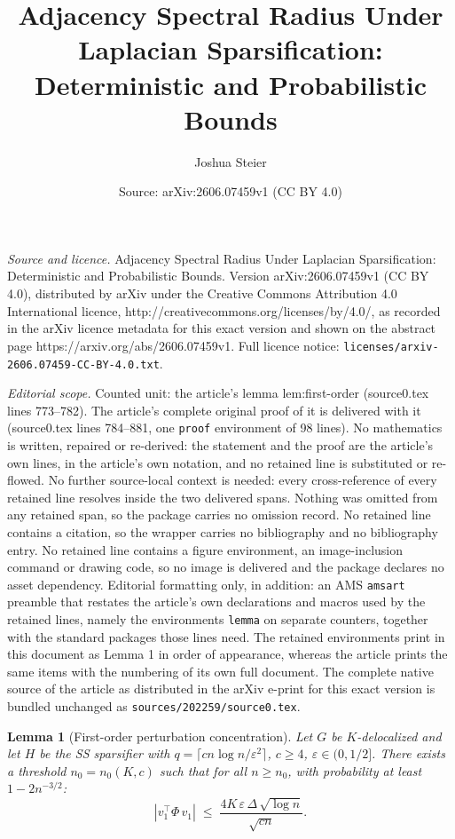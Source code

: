 \documentclass[10pt,a4paper]{amsart}
\title{Adjacency Spectral Radius Under Laplacian Sparsification:\\ Deterministic and Probabilistic Bounds}
\author{Joshua Steier}
\date{Source: arXiv:2606.07459v1 (CC BY 4.0)}
\newtheorem{lemma}{Lemma}
\newcommand{\eps}{\varepsilon}
\newcommand{\vone}{v_1}
\begin{document}
\maketitle

\noindent\emph{Source and licence.} Adjacency Spectral Radius Under Laplacian Sparsification:\\ Deterministic and Probabilistic Bounds. Version arXiv:2606.07459v1 (CC BY 4.0), distributed by arXiv under the Creative Commons Attribution 4.0 International licence, http://creativecommons.org/licenses/by/4.0/, as recorded in the arXiv licence metadata for this exact version and shown on the abstract page https://arxiv.org/abs/2606.07459v1. Full licence notice: \texttt{licenses/arxiv-2606.07459-CC-BY-4.0.txt}.\par\smallskip

\noindent\textit{Editorial scope.} Counted unit: the article's lemma lem:first-order (source0.tex lines 773--782). The article's complete original proof of it is delivered with it (source0.tex lines 784--881, one \texttt{proof} environment of 98 lines). No mathematics is written, repaired or re-derived: the statement and the proof are the article's own lines, in the article's own notation, and no retained line is substituted or re-flowed.  No further source-local context is needed: every cross-reference of every retained line resolves inside the two delivered spans.  Nothing was omitted from any retained span, so the package carries no omission record.  No retained line contains a citation, so the wrapper carries no bibliography and no bibliography entry.  No retained line contains a figure environment, an image-inclusion command or drawing code, so no image is delivered and the package declares no asset dependency.  Editorial formatting only, in addition: an AMS \texttt{amsart} preamble that restates the article's own declarations and macros used by the retained lines, namely the environments \texttt{lemma} on separate counters, together with the standard packages those lines need.  The retained environments print in this document as Lemma 1 in order of appearance, whereas the article prints the same items with the numbering of its own full document.  The complete native source of the article as distributed in the arXiv e-print for this exact version is bundled unchanged as \texttt{sources/202259/source0.tex}.
\begin{lemma}[First-order perturbation concentration]\label{lem:first-order}
Let $G$ be $K$-delocalized and let $H$ be the SS sparsifier with
$q = \lceil cn\log n/\eps^2 \rceil$, $c \geq 4$, $\eps \in (0, 1/2]$.
There exists a threshold $n_0 = n_0(K, c)$ such that for all $n \geq n_0$,
with probability at least $1 - 2n^{-3/2}$:
\[
|\vone^\top \Phi\,\vone|
\;\leq\; \frac{4K\,\eps\,\Delta\,\sqrt{\log n}}{\sqrt{cn}}.
\]
\end{lemma}
\end{document}
